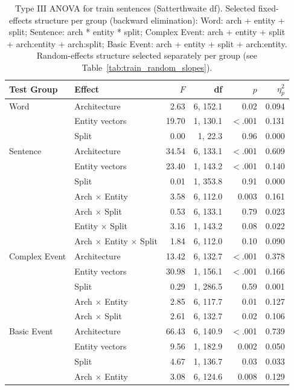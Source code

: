 \begin{table}[t]
\centering\small
\begin{tabular}{@{}llrrrr@{}}
\toprule
\textbf{Test Group} & \textbf{Effect} & $F$ & \textbf{df} & $p$ & $\eta^2_p$ \\
\midrule
Word & Architecture & 2.63 & 6, 152.1 & 0.02 & 0.094 \\
 & Entity vectors & 19.70 & 1, 130.1 & $<$.001 & 0.131 \\
 & Split & 0.00 & 1, 22.3 & 0.96 & 0.000 \\
\addlinespace
Sentence & Architecture & 34.54 & 6, 133.1 & $<$.001 & 0.609 \\
 & Entity vectors & 23.40 & 1, 143.2 & $<$.001 & 0.140 \\
 & Split & 0.01 & 1, 353.8 & 0.91 & 0.000 \\
 & Arch $\times$ Entity & 3.58 & 6, 112.0 & 0.003 & 0.161 \\
 & Arch $\times$ Split & 0.53 & 6, 133.1 & 0.79 & 0.023 \\
 & Entity $\times$ Split & 3.16 & 1, 143.2 & 0.08 & 0.022 \\
 & Arch $\times$ Entity $\times$ Split & 1.84 & 6, 112.0 & 0.10 & 0.090 \\
\addlinespace
Complex Event & Architecture & 13.42 & 6, 132.7 & $<$.001 & 0.378 \\
 & Entity vectors & 30.98 & 1, 156.1 & $<$.001 & 0.166 \\
 & Split & 0.29 & 1, 286.5 & 0.59 & 0.001 \\
 & Arch $\times$ Entity & 2.85 & 6, 117.7 & 0.01 & 0.127 \\
 & Arch $\times$ Split & 2.61 & 6, 132.7 & 0.02 & 0.106 \\
\addlinespace
Basic Event & Architecture & 66.43 & 6, 140.9 & $<$.001 & 0.739 \\
 & Entity vectors & 9.56 & 1, 182.9 & 0.002 & 0.050 \\
 & Split & 4.67 & 1, 136.7 & 0.03 & 0.033 \\
 & Arch $\times$ Entity & 3.08 & 6, 124.6 & 0.008 & 0.129 \\
\bottomrule
\end{tabular}
\caption{Type III ANOVA for train sentences (Satterthwaite df). Selected fixed-effects structure per group (backward elimination): Word: arch + entity + split; Sentence: arch * entity * split; Complex Event: arch + entity + split + arch:entity + arch:split; Basic Event: arch + entity + split + arch:entity. Random-effects structure selected separately per group (see Table~\ref{tab:train_random_slopes}).}
\label{tab:train_anova}
\end{table}
